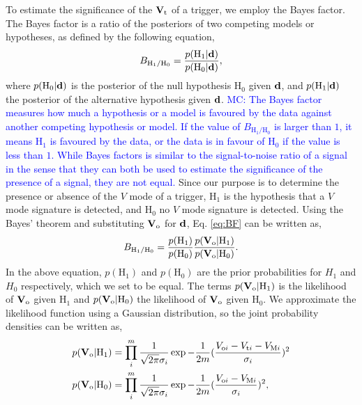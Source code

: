 \documentclass[aps,twocolumn,showpacs,groupedaddress, nofootinbib]{revtex4}  %
\newcommand{\MC}[1]{\textcolor{blue}{MC: #1}}
\begin{document}
To estimate the significance of the $\bold{V}_\text{t}$ of a trigger, we employ the Bayes factor.
The Bayes factor is a ratio of the posteriors of two competing models or hypotheses, as defined by the following equation,
\begin{equation}\label{eq:BF}
 B_{\text{H}_1 / \text{H}_0} = \frac{p(\text{H}_1 |\bold{d})}{p(\text{H}_0|\bold{d})},
\end{equation}
where $p(\text{H}_0|\bold{d})$ 
is the posterior of the null hypothesis $\text{H}_0$ given $\bold{d}$, 
and $p(\text{H}_1|\bold{d})$ the posterior of the alternative hypothesis given $\bold{d}$.
\MC{The Bayes factor measures how much a hypothesis or a model is favoured by the data against another competing hypothesis or model.
If the value of $B_{\text{H}_1 / \text{H}_0}$ is larger than $1$, it means $\text{H}_1$ is favoured by the data, 
or the data is in favour of $\text{H}_0$ if the value is less than $1$. 
While Bayes factors is similar to the signal-to-noise ratio of a signal in the sense that they can both be used to estimate the significance of the presence of a signal,
they are not equal.}
Since our purpose is to determine the presence or absence of the $V$ mode of a trigger,
$\text{H}_1$ is the hypothesis that a $V$ mode signature is detected, 
and $\text{H}_0$ no $V$ mode signature is detected.  
Using the Bayes' theorem and substituting $\bold{V}_\text{o}$ for $\bold{d}$, Eq. \ref{eq:BF} can be written as,
\begin{equation}\label{eq:BF2}
 B_{\text{H}_1 / \text{H}_0} = \frac{p(\text{H}_1)}{p(\text{H}_0)}\frac{p(\bold{V}_\text{o}|\text{H}_1)}{p(\bold{V}_\text{o}|\text{H}_0)}.
\end{equation}
In the above equation, $p(\text{H}_1)$ and $p(\text{H}_0)$ are the prior probabilities for $H_1$ and $H_0$ respectively, which we set to be equal.
The terms $p(\bold{V}_\text{o}|\text{H}_1)$ is the likelihood of $\bold{V}_\text{o}$ given $\text{H}_1$ and $p(\bold{V}_\text{o}|\text{H}_0)$ the likelihood of 
$\bold{V}_\text{o}$ given $\text{H}_0$.	
We approximate the likelihood function using a Gaussian distribution,
so the joint probability densities can be written as,
\begin{align}\label{eq:posterior}
 p(\bold{V}_\text{o}|\text{H}_1) &= \prod_{i}^{m} \frac{1}{\sqrt{2\pi} \sigma_i}\exp{-\frac{1}{2m}(\frac{V_{\text{o}i} - V_{\text{t}i} - V_{\text{M}i}}{\sigma_i} )^2} \\ \nonumber
 p(\bold{V}_\text{o}|\text{H}_0) &= \prod_{i}^{m} \frac{1}{\sqrt{2\pi} \sigma_i}\exp{-\frac{1}{2 m}(\frac{V_{\text{o}i}- V_{\text{M}i}}{\sigma_i})^2},
\end{align}
\end{document}
